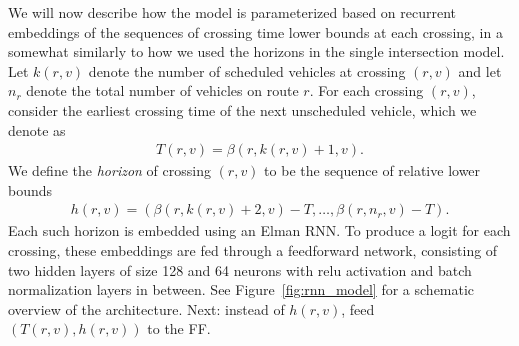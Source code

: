 \documentclass[a4paper]{article}
\theoremstyle{definition}
\theoremstyle{plain}
\begin{document}
We will now describe how the model is parameterized based on recurrent
embeddings of the sequences of crossing time lower bounds at each crossing, in a
somewhat similarly to how we used the horizons in the single intersection model.
%
Let $k(r, v)$ denote the number of scheduled vehicles at crossing $(r, v)$ and
let $n_{r}$ denote the total number of vehicles on route $r$. For each crossing
$(r, v)$, consider the earliest crossing time of the next unscheduled vehicle,
which we denote as
\begin{align*}
  T(r, v) = \beta(r, k(r, v) + 1, v) .
\end{align*}
We define the \textit{horizon} of crossing $(r, v)$ to be the sequence of relative lower bounds
\begin{align*}
  h(r, v) = (\beta(r, k(r, v) + 2, v) - T, \dots, \beta(r, n_{r}, v) - T) .
\end{align*}
%
Each such horizon is embedded using an Elman RNN. To produce a logit for each
crossing, these embeddings are fed through a feedforward network, consisting of
two hidden layers of size 128 and 64 neurons with relu activation and batch
normalization layers in between. See Figure~\ref{fig:rnn_model} for a schematic
overview of the architecture. {\color{Navy} Next: instead of $h(r, v)$, feed
  $(T(r, v), h(r, v))$ to the FF.}
\end{document}
